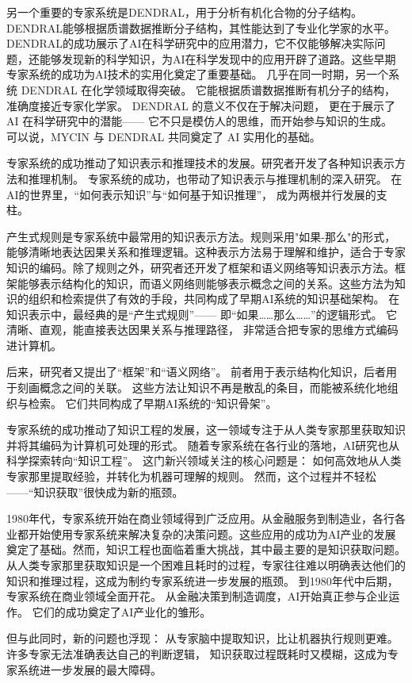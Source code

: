 另一个重要的专家系统是DENDRAL，用于分析有机化合物的分子结构。DENDRAL能够根据质谱数据推断分子结构，其性能达到了专业化学家的水平。DENDRAL的成功展示了AI在科学研究中的应用潜力，它不仅能够解决实际问题，还能够发现新的科学知识，为AI在科学发现中的应用开辟了道路。这些早期专家系统的成功为AI技术的实用化奠定了重要基础。
几乎在同一时期，另一个系统 DENDRAL 在化学领域取得突破。  
它能根据质谱数据推断有机分子的结构，准确度接近专家化学家。  
DENDRAL 的意义不仅在于解决问题，  
更在于展示了 AI 在科学研究中的潜能——  
它不只是模仿人的思维，而开始参与知识的生成。  
可以说，MYCIN 与 DENDRAL 共同奠定了 AI 实用化的基础。  

专家系统的成功推动了知识表示和推理技术的发展。研究者开发了各种知识表示方法和推理机制。
专家系统的成功，也带动了知识表示与推理机制的深入研究。  
在AI的世界里，“如何表示知识”与“如何基于知识推理”，  
成为两根并行发展的支柱。  

产生式规则是专家系统中最常用的知识表示方法。规则采用"如果-那么"的形式，能够清晰地表达因果关系和推理逻辑。这种表示方法易于理解和维护，适合于专家知识的编码。除了规则之外，研究者还开发了框架和语义网络等知识表示方法。框架能够表示结构化的知识，而语义网络则能够表示概念之间的关系。这些方法为知识的组织和检索提供了有效的手段，共同构成了早期AI系统的知识基础架构。
在知识表示中，最经典的是“产生式规则”——  
即“如果……那么……”的逻辑形式。  
它清晰、直观，能直接表达因果关系与推理路径，  
非常适合把专家的思维方式编码进计算机。  

后来，研究者又提出了“框架”和“语义网络”。  
前者用于表示结构化知识，后者用于刻画概念之间的关联。  
这些方法让知识不再是散乱的条目，而能被系统化地组织与检索。  
它们共同构成了早期AI系统的“知识骨架”。  

专家系统的成功推动了知识工程的发展，这一领域专注于从人类专家那里获取知识并将其编码为计算机可处理的形式。
随着专家系统在各行业的落地，AI研究也从科学探索转向“知识工程”。  
这门新兴领域关注的核心问题是：  
如何高效地从人类专家那里提取经验，并转化为机器可理解的规则。  
然而，这个过程并不轻松——“知识获取”很快成为新的瓶颈。  

1980年代，专家系统开始在商业领域得到广泛应用。从金融服务到制造业，各行各业都开始使用专家系统来解决复杂的决策问题。这些应用的成功为AI产业的发展奠定了基础。然而，知识工程也面临着重大挑战，其中最主要的是知识获取问题。从人类专家那里获取知识是一个困难且耗时的过程，专家往往难以明确表达他们的知识和推理过程，这成为制约专家系统进一步发展的瓶颈。
到1980年代中后期，专家系统在商业领域全面开花。  
从金融决策到制造调度，AI开始真正参与企业运作。  
它们的成功奠定了AI产业化的雏形。  

但与此同时，新的问题也浮现：  
从专家脑中提取知识，比让机器执行规则更难。  
许多专家无法准确表达自己的判断逻辑，  
知识获取过程既耗时又模糊，这成为专家系统进一步发展的最大障碍。  

